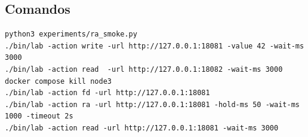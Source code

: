 \documentclass[11pt,a4paper]{article}
\begin{document}
\subsection*{Comandos}
\begin{verbatim}
python3 experiments/ra_smoke.py
./bin/lab -action write -url http://127.0.0.1:18081 -value 42 -wait-ms 3000
./bin/lab -action read  -url http://127.0.0.1:18082 -wait-ms 3000
docker compose kill node3
./bin/lab -action fd -url http://127.0.0.1:18081
./bin/lab -action ra -url http://127.0.0.1:18081 -hold-ms 50 -wait-ms 1000 -timeout 2s
./bin/lab -action read -url http://127.0.0.1:18081 -wait-ms 3000
\end{verbatim}
\end{document}
